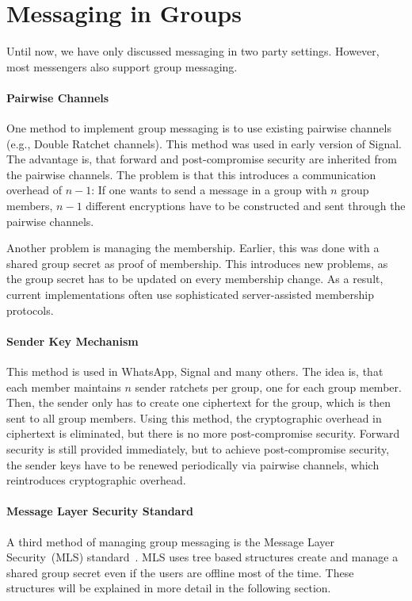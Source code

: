\section{Messaging in Groups}

Until now, we have only discussed messaging in two party settings.
However, most messengers also support group messaging.

\paragraph{Pairwise Channels} 
One method to implement group messaging is to use existing pairwise channels (e.g., Double Ratchet channels).
This method was used in early version of Signal.
The advantage is, that forward and post-compromise security are inherited from the pairwise channels.
The problem is that this introduces a communication overhead of $n-1$: 
If one wants to send a message in a group with $n$ group members, $n-1$ different encryptions have to be constructed and sent through the pairwise channels.

Another problem is managing the membership. 
Earlier, this was done with a shared group secret as proof of membership.
This introduces new problems, as the group secret has to be updated on every membership change.
As a result, current implementations often use sophisticated server-assisted membership protocols.

\paragraph{Sender Key Mechanism}
This method is used in WhatsApp, Signal and many others.
The idea is, that each member maintains $n$ sender ratchets per group, one for each group member.
Then, the sender only has to create one ciphertext for the group, which is then sent to all group members.
Using this method, the cryptographic overhead in ciphertext is eliminated, but there is no more post-compromise security.
Forward security is still provided immediately, but to achieve post-compromise security, the sender keys have to be renewed periodically via pairwise channels, which reintroduces cryptographic overhead.

\paragraph{Message Layer Security Standard}
A third method of managing group messaging is the Message Layer Security~(MLS) standard~\cite{rfc9420}.
MLS uses tree based structures create and manage a shared group secret even if the users are offline most of the time.
These structures will be explained in more detail in the following section.


